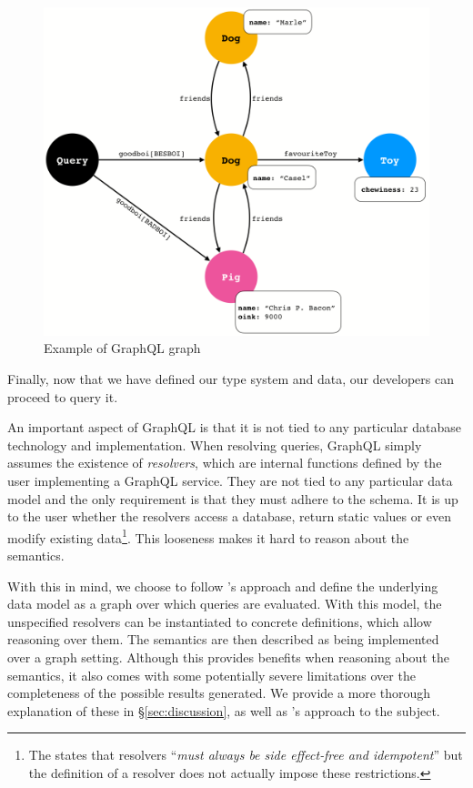 \begin{figure}
    \centering
    \includegraphics[scale=0.23]{imgs/graph.png}
    \caption{Example of GraphQL graph }
    \label{fig:graph_ex}
\end{figure}

Finally, now that we have defined our type system and data, our developers can proceed to query it.

 An important aspect of GraphQL is that it is not tied to any particular database technology and implementation. When resolving queries, GraphQL simply assumes the existence of \textit{resolvers}, which are internal functions defined by the user implementing a GraphQL service. They are not tied to any particular data model and the only requirement is that they must adhere to the schema. It is up to the user whether the resolvers access a database, return static values or even modify existing data\footnote{The \spec{} states that resolvers ``\textit{must always be side effect‐free and idempotent}'' but the definition of a resolver does not actually impose these restrictions.}. This looseness makes it hard to reason about the semantics.

With this in mind, we choose to follow \HP{}'s approach and define the underlying data model as a graph over which queries are evaluated. With this model, the unspecified resolvers can be instantiated to concrete definitions, which allow reasoning over them. The semantics are then described as being implemented over a graph setting. Although this provides benefits when reasoning about the semantics, it also comes with some potentially severe limitations over the completeness of the possible results generated. We provide a more thorough explanation of these in \S\ref{sec:discussion}, as well as \HP{}'s approach to the subject.


